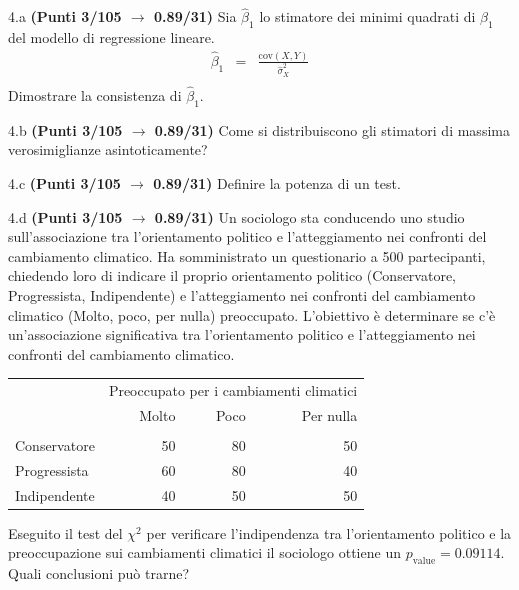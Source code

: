\documentclass[
  11pt,
]{book}
\theoremstyle{mytheoremstyle}
\theoremstyle{mydefstyle}
\begin{document}
4.a \textbf{(Punti 3/105 \(\rightarrow\) 0.89/31)} Sia \(\hat \beta_1\) lo stimatore dei minimi quadrati di \(\beta_1\) del modello di regressione lineare.
\begin{eqnarray*}
  \hat\beta_1 &=&  \frac{\text{cov}(X,Y)}{\hat\sigma_X^2}\\
\end{eqnarray*}
Dimostrare la consistenza di \(\hat\beta_1\).

4.b \textbf{(Punti 3/105 \(\rightarrow\) 0.89/31)} Come si distribuiscono gli stimatori di massima verosimiglianze asintoticamente?

4.c \textbf{(Punti 3/105 \(\rightarrow\) 0.89/31)} Definire la potenza di un test.

4.d \textbf{(Punti 3/105 \(\rightarrow\) 0.89/31)} Un sociologo sta conducendo uno studio sull'associazione tra l'orientamento politico e l'atteggiamento nei confronti del cambiamento climatico. Ha somministrato un questionario a 500 partecipanti, chiedendo loro di indicare il proprio orientamento politico (Conservatore, Progressista, Indipendente) e l'atteggiamento nei confronti del cambiamento climatico (Molto, poco, per nulla) preoccupato. L'obiettivo è determinare se c'è un'associazione significativa tra l'orientamento politico e l'atteggiamento nei confronti del cambiamento climatico.

\begin{table}[H]
\centering\centering\centering
\begin{tabular}{lrrr}
\toprule
\multicolumn{1}{c}{ } & \multicolumn{3}{c}{Preoccupato per i cambiamenti climatici} \\
\cmidrule(l{3pt}r{3pt}){2-4}
  & Molto & Poco & Per nulla\\
\midrule
\addlinespace[0.3em]
\multicolumn{4}{l}{\textbf{Orientamento politico}}\\
\hspace{1em}Conservatore & 50 & 80 & 50\\
\hspace{1em}Progressista & 60 & 80 & 40\\
\hspace{1em}Indipendente & 40 & 50 & 50\\
\bottomrule
\end{tabular}
\end{table}

Eseguito il test del \(\chi^2\) per verificare l'indipendenza tra l'orientamento politico e la preoccupazione
sui cambiamenti climatici il sociologo ottiene un \(p_\text{value}=0.09114\). Quali conclusioni può trarne?
\end{document}

